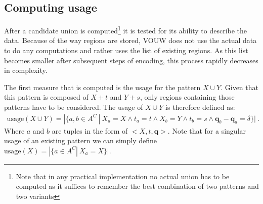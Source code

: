 \documentclass{llncs}
\begin{document}
\subsection{Computing usage}
After a candidate union is computed\footnote{Note that in any practical implementation no actual union has to be computed as it suffices to remember the best combination of two patterns and two variants} it is tested for its ability to describe the data. Because of the way regions are stored, VOUW does not use the actual data to do any computations and rather uses the list of existing regions. As this list becomes smaller after subsequent steps of encoding, this process rapidly decreases in complexity.

The first measure that is computed is the usage for the pattern $X \cup Y$. Given that this pattern is composed of $X+t$ and $Y+s$, only regions containing those patterns have to be considered. The usage of $X\cup Y$ is therefore defined as:
\begin{align*}
\mathrm{usage}(X\cup Y) = |\{a,b \in A^C \ | \ X_a=X \land t_a=t \land X_b=Y \land t_b=s \land \mathbf{q}_b-\mathbf{q}_a = \delta\}| \ .
\end{align*}
Where $a$ and $b$ are tuples in the form of $<X,t,\mathbf{q}>$. Note that for a singular usage of an existing pattern we can simply define $\mathrm{usage}(X)=|\{a \in A^C | \ X_a=X \}|$.
\end{document}
